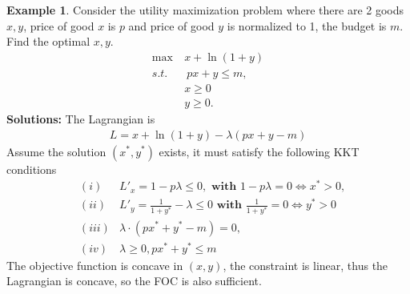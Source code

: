 \documentclass[10pt,a4paper]{book}
\theoremstyle{definition}\newtheorem{definition}{Definition}
\theoremstyle{definition}\newtheorem{fact}{Fact}
\theoremstyle{definition}\newtheorem{ex}{Ex.}
\theoremstyle{definition}\newtheorem{project}{Project}
\theoremstyle{definition}\newtheorem{problem}{Problem}
\theoremstyle{definition}\newtheorem{example}{Example}
\numberwithin{theorem}{chapter}
\numberwithin{corollary}{chapter}
\numberwithin{assumption}{chapter}
\numberwithin{definition}{chapter}
\numberwithin{prop}{chapter}
\numberwithin{notation}{chapter}
\numberwithin{problem}{chapter}
\numberwithin{example}{chapter}
\numberwithin{fact}{chapter}
\numberwithin{ex}{chapter}
\begin{document}
	\begin{example} \label{example:kkt2}
		Consider the utility maximization problem where there are 2 goods $x,y$, price of good $x$ is $p$ and price of good $y$ is normalized to 1, the budget is $m$. Find the optimal $x,y$.
		\begin{align*}
			\max \ & x + \ln(1+y)                                         \\
			s.t. &\ px + y \leq m, \\
			 & x \geq 0 \\
			 & y \geq 0.                                      
		\end{align*}
		\textbf{Solutions:}
		The Lagrangian is
		\begin{align*}
			L = x + \ln(1+y) - \lambda (px + y - m)
		\end{align*}
		Assume the solution $(x^*,y^*)$ exists, it must satisfy the following KKT conditions
		\begin{align*}
			&(i) & L'_x = 1 - p \lambda \leq 0, \textbf{ with }  1- p\lambda = 0 \iff x^* > 0,  \\
			&(ii) & L'_y = \frac{1}{1+y^*} -\lambda \leq 0 \textbf{ with } \frac{1}{1+y^*} = 0 \iff y^* > 0 \\
			&(iii) & \lambda \cdot (px^* + y^* - m) = 0, \\
			& (iv) & \lambda \geq 0, px^* + y^* \leq m
		\end{align*}
		The objective function is concave in $(x,y)$, the constraint is linear, thus the Lagrangian is concave, so the FOC is also sufficient.
		

\end{example}
\end{document}
